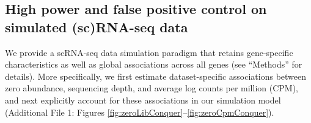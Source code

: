 \documentclass{bmcart}
\newcommand{\koen}[1]{\textcolor{olive}{*** KVdB: #1}}
\begin{document}
\subsection*{High power and false positive control on simulated (sc)RNA-seq data}
We provide a scRNA-seq data simulation paradigm that retains gene-specific characteristics as well as global associations across all genes (see ``Methods'' for details).
More specifically, we first estimate dataset-specific associations between zero abundance, sequencing depth, and average log counts per million (CPM), and next explicitly account for these associations in our simulation model (Additional File 1: Figures \ref{fig:zeroLibConquer}--\ref{fig:zeroCpmConquer}).
\end{document}
